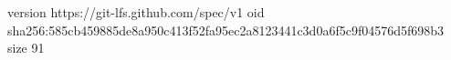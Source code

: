 version https://git-lfs.github.com/spec/v1
oid sha256:585cb459885de8a950c413f52fa95ec2a8123441c3d0a6f5c9f04576d5f698b3
size 91
